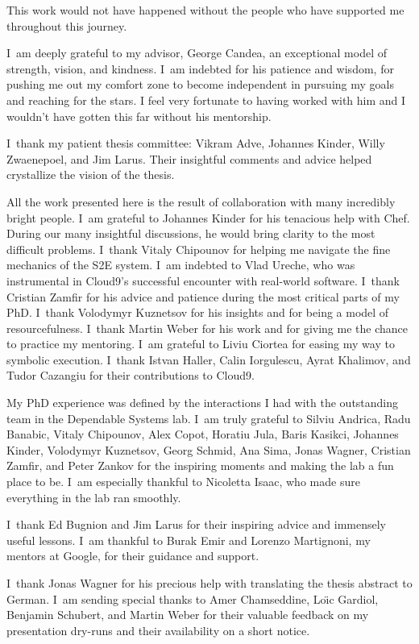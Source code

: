 This work would not have happened without the people who have supported me throughout this journey.


I~am deeply grateful to my advisor, George Candea, an exceptional model of strength, vision, and kindness.
%
I~am indebted for his patience and wisdom, for pushing me out my comfort zone to become independent in pursuing my goals and reaching for the stars.  I feel very fortunate to having worked with him and I wouldn't have gotten this far without his mentorship.


I~thank my patient thesis committee: Vikram Adve, Johannes Kinder, Willy Zwaenepoel, and Jim Larus.  Their insightful comments and advice helped crystallize the vision of the thesis.


All the work presented here is the result of collaboration with many incredibly bright people.
%
I~am grateful to Johannes Kinder for his tenacious help with Chef.  During our many insightful discussions, he would bring clarity to the most difficult problems.
%
I~thank Vitaly Chipounov for helping me navigate the fine mechanics of the S2E system.
%
I~am indebted to Vlad Ureche, who was instrumental in Cloud9's successful encounter with real-world software.
%
I~thank Cristian Zamfir for his advice and patience during the most critical parts of my PhD.
%
I~thank Volodymyr Kuznetsov for his insights and for being a model of resourcefulness.
%
I~thank Martin Weber for his work and for giving me the chance to practice my mentoring. 
%
I~am grateful to Liviu Ciortea for easing my way to symbolic execution.
%
I~thank Istvan Haller, Calin Iorgulescu, Ayrat Khalimov, and Tudor Cazangiu for their contributions to Cloud9.


My PhD experience was defined by the interactions I had with the outstanding team in the Dependable Systems lab.
%
I~am truly grateful to Silviu Andrica, Radu Banabic, Vitaly Chipounov, Alex Copot, Horatiu Jula, Baris Kasikci, Johannes Kinder, Volodymyr Kuznetsov, Georg Schmid, Ana Sima, Jonas Wagner, Cristian Zamfir, and Peter Zankov for the inspiring moments and making the lab a fun place to be.
%
I~am especially thankful to Nicoletta Isaac, who made sure everything in the lab ran smoothly.


I~thank Ed Bugnion and Jim Larus for their inspiring advice and immensely useful lessons.
%
I~am thankful to Burak Emir and Lorenzo Martignoni, my mentors at Google, for their guidance and support.


I~thank Jonas Wagner for his precious help with translating the thesis abstract to German.
%
I~am sending special thanks to Amer Chamseddine, Lo\"{\i}c Gardiol, Benjamin Schubert, and Martin Weber for their valuable feedback on my presentation dry-runs and their availability on a short notice.


